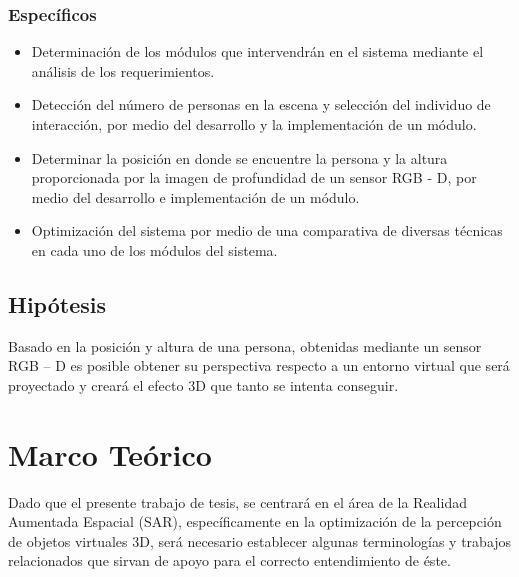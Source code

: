 \documentclass[a4paper,openright,12pt]{report}
\begin{document}
\subsection{Específicos}
\begin{itemize}
\item Determinación de los módulos que intervendrán en el sistema mediante el análisis de los requerimientos.
\item Detección del número de personas en la escena y selección del individuo de interacción, por medio del desarrollo y la implementación de un módulo.
\item Determinar la posición en donde se encuentre la persona y la altura proporcionada por la imagen de profundidad de un sensor RGB - D, por medio del desarrollo e implementación de un módulo.
\item Optimización del sistema por medio de una comparativa de diversas técnicas en cada uno de los módulos del sistema.
\end{itemize}
%
\section{Hipótesis}
Basado en la posición y altura de una persona, obtenidas mediante un sensor RGB – D es posible obtener su perspectiva respecto a un entorno virtual que será proyectado y creará el efecto 3D que tanto se intenta conseguir.

\chapter{Marco Teórico}\label{cap.marcoteorico}
Dado que el presente trabajo de tesis, se centrará en el área de la Realidad Aumentada Espacial (SAR), específicamente en la optimización de la percepción de objetos virtuales 3D, será necesario establecer algunas terminologías y trabajos relacionados que sirvan de apoyo para el correcto entendimiento de éste.
\end{document}
